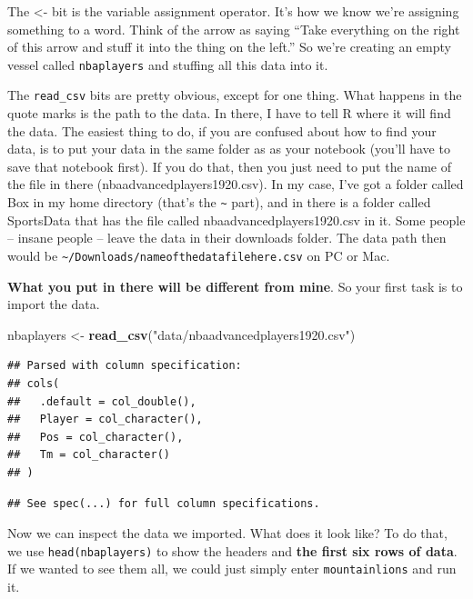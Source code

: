\documentclass[
]{book}
\newenvironment{Shaded}{\begin{snugshade}}{\end{snugshade}}
\newcommand{\KeywordTok}[1]{\textcolor[rgb]{0.13,0.29,0.53}{\textbf{#1}}}
\newcommand{\NormalTok}[1]{#1}
\newcommand{\StringTok}[1]{\textcolor[rgb]{0.31,0.60,0.02}{#1}}
\begin{document}
The \textless- bit is the variable assignment operator. It's how we know we're assigning something to a word. Think of the arrow as saying ``Take everything on the right of this arrow and stuff it into the thing on the left.'' So we're creating an empty vessel called \texttt{nbaplayers} and stuffing all this data into it.

The \texttt{read\_csv} bits are pretty obvious, except for one thing. What happens in the quote marks is the path to the data. In there, I have to tell R where it will find the data. The easiest thing to do, if you are confused about how to find your data, is to put your data in the same folder as as your notebook (you'll have to save that notebook first). If you do that, then you just need to put the name of the file in there (nbaadvancedplayers1920.csv). In my case, I've got a folder called Box in my home directory (that's the \texttt{\textasciitilde{}} part), and in there is a folder called SportsData that has the file called nbaadvancedplayers1920.csv in it. Some people -- insane people -- leave the data in their downloads folder. The data path then would be \texttt{\textasciitilde{}/Downloads/nameofthedatafilehere.csv} on PC or Mac.

\textbf{What you put in there will be different from mine}. So your first task is to import the data.

\begin{Shaded}
\begin{Highlighting}[]
\NormalTok{nbaplayers <-}\StringTok{ }\KeywordTok{read_csv}\NormalTok{(}\StringTok{"data/nbaadvancedplayers1920.csv"}\NormalTok{)}
\end{Highlighting}
\end{Shaded}

\begin{verbatim}
## Parsed with column specification:
## cols(
##   .default = col_double(),
##   Player = col_character(),
##   Pos = col_character(),
##   Tm = col_character()
## )
\end{verbatim}

\begin{verbatim}
## See spec(...) for full column specifications.
\end{verbatim}

Now we can inspect the data we imported. What does it look like? To do that, we use \texttt{head(nbaplayers)} to show the headers and \textbf{the first six rows of data}. If we wanted to see them all, we could just simply enter \texttt{mountainlions} and run it.
\end{document}
